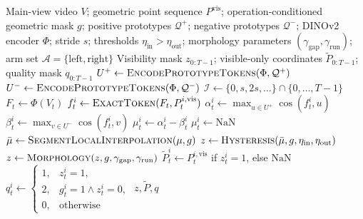 \begin{algorithm}[t]
\caption{Appearance-Gated Visibility for the Geometric End-Effector Track}
\label{alg:dino-eef-visibility}
\begin{algorithmic}[1]
\Require Main-view video $V$; geometric point sequence $P^{\mathrm{vis}}$;
operation-conditioned geometric mask $g$; positive prototypes $\mathcal{Q}^{+}$; negative prototypes
$\mathcal{Q}^{-}$; DINOv2 encoder $\Phi$; stride $s$; thresholds
$\eta_{\mathrm{in}}>\eta_{\mathrm{out}}$; morphology parameters
$(\gamma_{\mathrm{gap}},\gamma_{\mathrm{run}})$; arm set
$\mathcal{A}=\{\mathrm{left},\mathrm{right}\}$
\Ensure Visibility mask $z_{0:T-1}$; visible-only coordinates
$\widetilde P_{0:T-1}$; quality mask $q_{0:T-1}$
\State $U^{+}\gets\textsc{EncodePrototypeTokens}(\Phi,\mathcal{Q}^{+})$
\State $U^{-}\gets\textsc{EncodePrototypeTokens}(\Phi,\mathcal{Q}^{-})$
\State $\mathcal{I}\gets\{0,s,2s,\ldots\}\cap\{0,\ldots,T-1\}$
    \State $F_t\gets\Phi(V_t)$
            \State $f^i_t\gets\textsc{ExactToken}(F_t,P^{i,\mathrm{vis}}_t)$
            \State $\alpha^i_t\gets\max_{u\in U^{+}}\cos(f^i_t,u)$
            \State $\beta^i_t\gets\max_{v\in U^{-}}\cos(f^i_t,v)$
            \State $\mu^i_t\gets\alpha^i_t-\beta^i_t$
        \Else
            \State $\mu^i_t\gets\mathrm{NaN}$
        \EndIf
    \EndFor
\EndFor
\State $\bar\mu\gets\textsc{SegmentLocalInterpolation}(\mu,g)$
\State $z\gets\textsc{Hysteresis}(\bar\mu,g,\eta_{\mathrm{in}},\eta_{\mathrm{out}})$
\State $z\gets\textsc{Morphology}(z,g,\gamma_{\mathrm{gap}},\gamma_{\mathrm{run}})$
        \State $\widetilde P^i_t\gets P^{i,\mathrm{vis}}_t$ if $z^i_t=1$, else $\mathrm{NaN}$
        \State $q^i_t\gets
        \begin{cases}
        1,&z^i_t=1,\\
        2,&g^i_t=1\land z^i_t=0,\\
        0,&\text{otherwise}
        \end{cases}$
    \EndFor
\EndFor
\State \Return $z,\widetilde P,q$
\end{algorithmic}
\end{algorithm}

